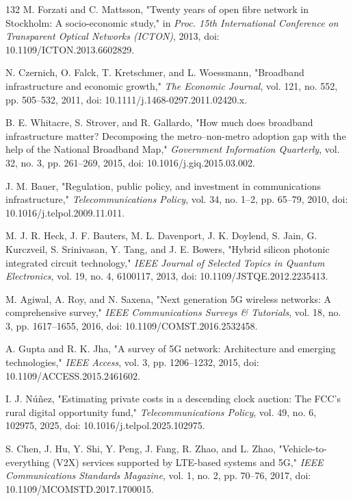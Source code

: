 \documentclass[pdflatex,sn-mathphys-num]{sn-jnl}%
\theoremstyle{thmstyleone}%
\theoremstyle{thmstyletwo}%
\theoremstyle{thmstylethree}%
\begin{document}
\begin{thebibliography}{132}
 M. Forzati and C. Mattsson, "Twenty years of open fibre network in Stockholm: A socio-economic study," in \emph{Proc. 15th International Conference on Transparent Optical Networks (ICTON)}, 2013, doi: 10.1109/ICTON.2013.6602829.

 N. Czernich, O. Falck, T. Kretschmer, and L. Woessmann, "Broadband infrastructure and economic growth," \emph{The Economic Journal}, vol. 121, no. 552, pp. 505--532, 2011, doi: 10.1111/j.1468-0297.2011.02420.x.

 B. E. Whitacre, S. Strover, and R. Gallardo, "How much does broadband infrastructure matter? Decomposing the metro--non-metro adoption gap with the help of the National Broadband Map," \emph{Government Information Quarterly}, vol. 32, no. 3, pp. 261--269, 2015, doi: 10.1016/j.giq.2015.03.002.

 J. M. Bauer, "Regulation, public policy, and investment in communications infrastructure," \emph{Telecommunications Policy}, vol. 34, no. 1--2, pp. 65--79, 2010, doi: 10.1016/j.telpol.2009.11.011.

 M. J. R. Heck, J. F. Bauters, M. L. Davenport, J. K. Doylend, S. Jain, G. Kurczveil, S. Srinivasan, Y. Tang, and J. E. Bowers, "Hybrid silicon photonic integrated circuit technology," \emph{IEEE Journal of Selected Topics in Quantum Electronics}, vol. 19, no. 4, 6100117, 2013, doi: 10.1109/JSTQE.2012.2235413.

 M. Agiwal, A. Roy, and N. Saxena, "Next generation 5G wireless networks: A comprehensive survey," \emph{IEEE Communications Surveys \& Tutorials}, vol. 18, no. 3, pp. 1617--1655, 2016, doi: 10.1109/COMST.2016.2532458.

 A. Gupta and R. K. Jha, "A survey of 5G network: Architecture and emerging technologies," \emph{IEEE Access}, vol. 3, pp. 1206--1232, 2015, doi: 10.1109/ACCESS.2015.2461602.

 I. J. N\'u\~nez, "Estimating private costs in a descending clock auction: The FCC's rural digital opportunity fund," \emph{Telecommunications Policy}, vol. 49, no. 6, 102975, 2025, doi: 10.1016/j.telpol.2025.102975.

 S. Chen, J. Hu, Y. Shi, Y. Peng, J. Fang, R. Zhao, and L. Zhao, "Vehicle-to-everything (V2X) services supported by LTE-based systems and 5G," \emph{IEEE Communications Standards Magazine}, vol. 1, no. 2, pp. 70--76, 2017, doi: 10.1109/MCOMSTD.2017.1700015.


\end{thebibliography}
\end{document}
